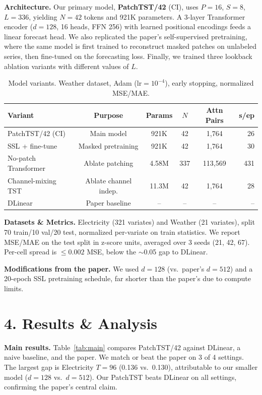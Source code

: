 \documentclass[11pt]{article}
\begin{document}
\textbf{Architecture.} Our primary model, \textbf{PatchTST/42} (CI), uses $P=16$, $S=8$, $L=336$, yielding $N=42$ tokens and 921K parameters. A 3-layer Transformer encoder ($d=128$, 16 heads, FFN 256) with learned positional encodings feeds a linear forecast head. We also replicated the paper's self-supervised pretraining, where the same model is first trained to reconstruct masked patches on unlabeled series, then fine-tuned on the forecasting loss. Finally, we trained three lookback ablation variants with different values of $L$.

\begin{table}[H]
\centering\small
\caption{Model variants. Weather dataset, Adam ($\text{lr}=10^{-4}$), early stopping, normalized MSE/MAE.}
\label{tab:variants}
\begin{tabular}{lccccr}
\toprule
Variant & Purpose & Params & $N$ & Attn Pairs & s/ep \\
\midrule
PatchTST/42 (CI) & Main model & 921K & 42 & 1,764 & 26 \\
SSL + fine-tune & Masked pretraining & 921K & 42 & 1,764 & 30 \\
No-patch Transformer & Ablate patching & 4.58M & 337 & 113,569 & 431 \\
Channel-mixing TST & Ablate channel indep. & 11.3M & 42 & 1,764 & 28 \\
DLinear & Paper baseline & {--} & {--} & {--} & {--} \\
\bottomrule
\end{tabular}
\end{table}

\textbf{Datasets \& Metrics.} Electricity (321 variates) and Weather (21 variates), split 70 train/10 val/20 test, normalized per-variate on train statistics. We report MSE/MAE on the test split in z-score units, averaged over 3 seeds (21, 42, 67). Per-cell spread is $\leq 0.002$ MSE, below the $\sim$0.05 gap to DLinear.

\textbf{Modifications from the paper.} We used $d=128$ (vs.\ paper's $d=512$) and a 20-epoch SSL pretraining schedule, far shorter than the paper's due to compute limits. 

\section*{4. Results \& Analysis}

\textbf{Main results.} Table~\ref{tab:main} compares PatchTST/42 against DLinear, a naive baseline, and the paper. We match or beat the paper on 3 of 4 settings. The largest gap is Electricity $T=96$ (0.136 vs.\ 0.130), attributable to our smaller model ($d=128$ vs.\ $d=512$). Our PatchTST beats DLinear on all settings, confirming the paper's central claim.
\end{document}
